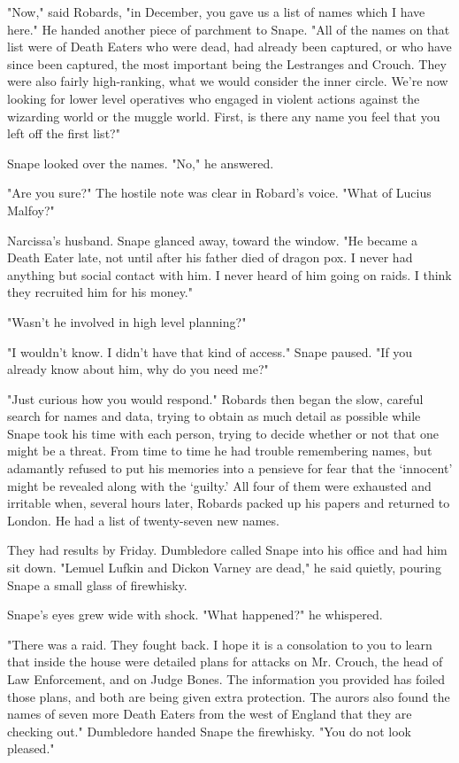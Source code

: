 "Now," said Robards, "in December, you gave us a list of names which I have here." He handed another piece of parchment to Snape. "All of the names on that list were of Death Eaters who were dead, had already been captured, or who have since been captured, the most important being the Lestranges and Crouch. They were also fairly high-ranking, what we would consider the inner circle. We're now looking for lower level operatives who engaged in violent actions against the wizarding world or the muggle world. First, is there any name you feel that you left off the first list?"

Snape looked over the names. "No," he answered.

"Are you sure?" The hostile note was clear in Robard's voice. "What of Lucius Malfoy?"

Narcissa's husband. Snape glanced away, toward the window. "He became a Death Eater late, not until after his father died of dragon pox. I never had anything but social contact with him. I never heard of him going on raids. I think they recruited him for his money."

"Wasn't he involved in high level planning?"

"I wouldn't know. I didn't have that kind of access." Snape paused. "If you already know about him, why do you need me?"

"Just curious how you would respond." Robards then began the slow, careful search for names and data, trying to obtain as much detail as possible while Snape took his time with each person, trying to decide whether or not that one might be a threat. From time to time he had trouble remembering names, but adamantly refused to put his memories into a pensieve for fear that the `innocent' might be revealed along with the `guilty.' All four of them were exhausted and irritable when, several hours later, Robards packed up his papers and returned to London. He had a list of twenty-seven new names.

They had results by Friday. Dumbledore called Snape into his office and had him sit down. "Lemuel Lufkin and Dickon Varney are dead," he said quietly, pouring Snape a small glass of firewhisky.

Snape's eyes grew wide with shock. "What happened?" he whispered.

"There was a raid. They fought back. I hope it is a consolation to you to learn that inside the house were detailed plans for attacks on Mr. Crouch, the head of Law Enforcement, and on Judge Bones. The information you provided has foiled those plans, and both are being given extra protection. The aurors also found the names of seven more Death Eaters from the west of England that they are checking out." Dumbledore handed Snape the firewhisky. "You do not look pleased."

